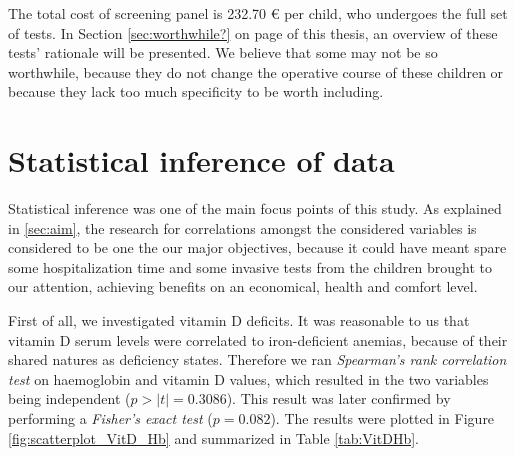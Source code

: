 
The total cost of screening panel is 232.70 € per child, who undergoes the full set of tests. In Section \ref{sec:worthwhile?} on page \pageref{sec:worthwhile?} of this thesis, an overview of these tests' rationale will be presented. We believe that some may not be so worthwhile, because they do not change the operative course of these children or because they lack too much specificity to be worth including.

\section{Statistical inference of data}\label{sec:statisticalinference}
Statistical inference was one of the main focus points of this study. As explained in \ref{sec:aim}, the research for correlations amongst the considered variables is considered to be one the our major objectives, because it could have meant spare some hospitalization time and some invasive tests from the children brought to our attention, achieving benefits on an economical, health and comfort level.

First of all, we investigated vitamin D deficits. It was reasonable to us that vitamin D serum levels were correlated to iron-deficient anemias, because of their shared natures as deficiency states. Therefore we ran \textit{Spearman's rank correlation test} on haemoglobin and vitamin D values, which resulted in the two variables being independent ($p>|t|=0.3086$). This result was later confirmed by performing a \textit{Fisher's exact test} ($p=0.082$). The results were plotted in Figure \ref{fig:scatterplot_VitD_Hb} and summarized in Table \ref{tab:VitDHb}.

